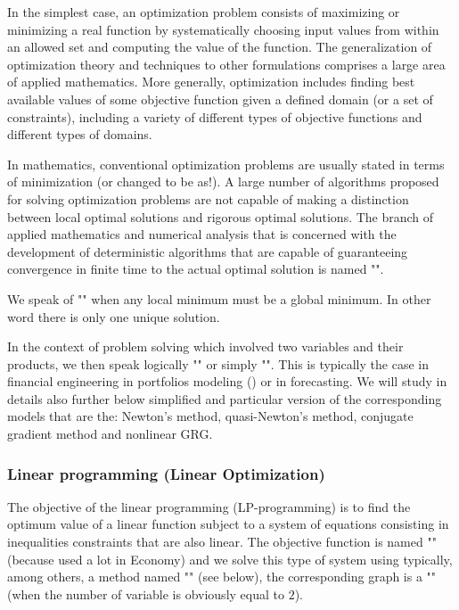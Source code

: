 	In the simplest case, an optimization problem consists of maximizing or minimizing a real function by systematically choosing input values from within an allowed set and computing the value of the function. The generalization of optimization theory and techniques to other formulations comprises a large area of applied mathematics. More generally, optimization includes finding best available values of some objective function given a defined domain (or a set of constraints), including a variety of different types of objective functions and different types of domains.
	
	In mathematics, conventional optimization problems are usually stated in terms of minimization (or changed to be as!). A large number of algorithms proposed for solving optimization problems are not capable of making a distinction between local optimal solutions and rigorous optimal solutions. The branch of applied mathematics and numerical analysis that is concerned with the development of deterministic algorithms that are capable of guaranteeing convergence in finite time to the actual optimal solution is named "".
	\begin{tcolorbox}[title=Remark,colframe=black,arc=10pt]
	We speak of "" when any local minimum must be a global minimum. In other word there is only one unique solution.
	\end{tcolorbox}
	In the context of problem solving which involved two variables and their products, we then speak logically "" or simply "". This is typically the case in financial engineering in portfolios modeling () or in forecasting. We will study in details also further below simplified and particular version of the corresponding models that are the: Newton's method, quasi-Newton's method, conjugate gradient method and nonlinear GRG.
	
	\pagebreak
	\subsubsection{Linear programming (Linear Optimization)}\label{linear programming}
	The objective of the linear programming (LP-programming) is to find the optimum value of a linear function subject to a system of equations consisting in inequalities constraints that are also linear. The objective function is named "" (because used a lot in Economy) and we solve this type of system using typically, among others, a method named "\label{simplex method}" (see below), the corresponding graph is a "" (when the number of variable is obviously equal to $2$).
	
